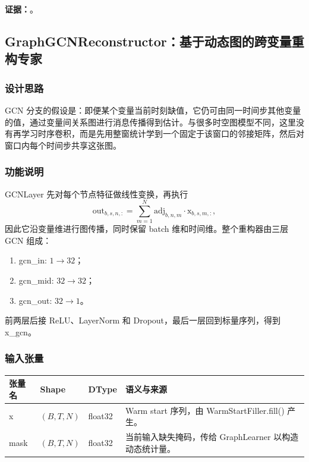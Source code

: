 \documentclass[11pt,a4paper]{ctexart}
\newcommand{\code}[1]{{\ttfamily\small #1}}
\newcommand{\evidence}[1]{\textbf{证据：}#1}
\begin{document}
\evidence{。}

\subsection{GraphGCNReconstructor：基于动态图的跨变量重构专家}

\subsubsection{设计思路}

GCN 分支的假设是：即便某个变量当前时刻缺值，它仍可由同一时间步其他变量的值，通过变量间关系图进行消息传播得到估计。与很多时空图模型不同，这里没有再学习时序卷积，而是先用整窗统计学到一个固定于该窗口的邻接矩阵，然后对窗口内每个时间步共享这张图。

\subsubsection{功能说明}

\code{GCNLayer} 先对每个节点特征做线性变换，再执行
\[
\text{out}_{b,s,n,:} = \sum_{m=1}^{N} \text{adj}_{b,n,m} \cdot \text{x}_{b,s,m,:},
\]
因此它沿变量维进行图传播，同时保留 batch 维和时间维。整个重构器由三层 GCN 组成：
\begin{enumerate}
  \item \code{gcn\_in}: $1 \rightarrow 32$；
  \item \code{gcn\_mid}: $32 \rightarrow 32$；
  \item \code{gcn\_out}: $32 \rightarrow 1$。
\end{enumerate}

前两层后接 ReLU、LayerNorm 和 Dropout，最后一层回到标量序列，得到 \code{x\_gcn}。

\subsubsection{输入张量}

\begin{tabularx}{\textwidth}{@{}L{3.6cm}L{2.3cm}L{1.5cm}Y@{}}
\toprule
张量名 & Shape & DType & 语义与来源 \\
\midrule
\code{x} & $(B,T,N)$ & \code{float32} & Warm start 序列，由 \code{WarmStartFiller.fill()} 产生。 \\
\code{mask} & $(B,T,N)$ & \code{float32} & 当前输入缺失掩码，传给 \code{GraphLearner} 以构造动态统计量。 \\
\bottomrule
\end{tabularx}
\end{document}
